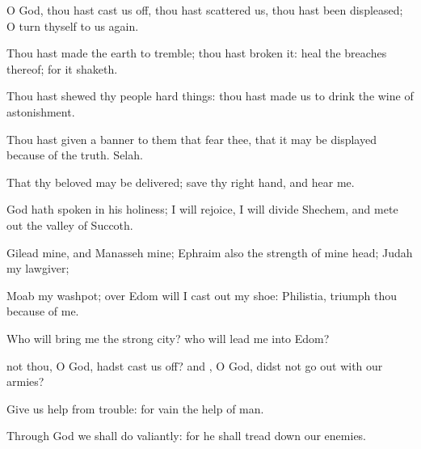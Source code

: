 {\Q {}O
God, thou hast cast us
off, thou hast
scattered us, thou hast been
displeased; O turn thyself to us
again.


\par }{\Q {}Thou hast made the
earth to
tremble; thou hast
broken it:
heal the
breaches thereof; for it
shaketh.


\par }{\Q {}Thou hast
shewed thy
people hard
things: thou hast made us to
drink the
wine of
astonishment.


\par }{\Q {}Thou hast
given a
banner to them that
fear thee, that it may be
displayed
because of the
truth.
Selah.


\par }{\Q {}That thy
beloved may be
delivered;
save
{} thy right
hand, and
hear me.


\par }{\BB \par }
{\Q {}God hath
spoken in his
holiness; I will
rejoice, I will
divide
Shechem, and mete
out the
valley of
Succoth.


\par }{\Q {}Gilead
{} mine, and
Manasseh
{} mine;
Ephraim also
{} the
strength of mine
head;
Judah
{} my
lawgiver;


\par }{\Q {}Moab
{} my
washpot; over
Edom will I cast
out my
shoe:
Philistia,
triumph thou because of me.


\par }{\Q {}Who will
bring me
{} the
strong
city? who will
lead me into
Edom?


\par }{\Q {} not thou, O
God,
{} hadst cast us
off? and
{}, O
God,
{} didst not go
out with our
armies?


\par }{\Q {}Give us
help from
trouble: for
vain
{} the
help of
man.


\par }{\Q {}Through
God we shall
do
valiantly: for he
{} shall tread
down our
enemies.




\par }
